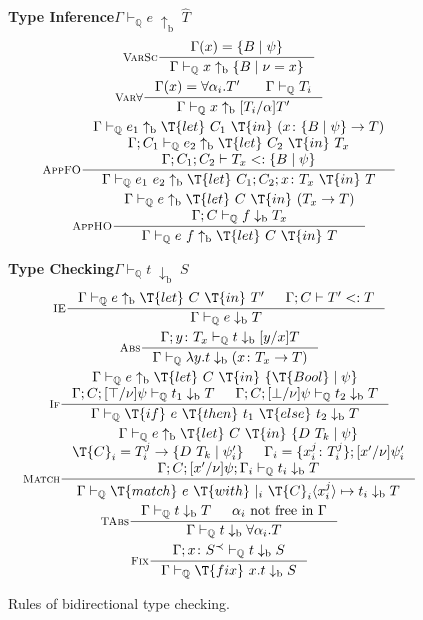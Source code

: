 \documentclass[10pt,preprint]{sigplanconf-pldi16}
\theoremstyle{definition}
\newcommand{\Subt}{<:}
\newcommand{\App}[2]{{#1}\ {#2}}
\newcommand{\env}{\Gamma}
\newcommand{\produceB}{\;{\mathrm{\uparrow_b}}\;}
\newcommand{\consumeB}{\;{\mathrm{\downarrow_b}}\;}
\newcommand{\funT}[3]{{#1}\colon {#2} \to {#3}}
\newcommand{\before}{\prec}
\newcommand{\contT}[2]{\T{let}\ {#1}\ \T{in}\ {#2}}
\newcommand{\quals}{\mathbb{Q}}
\newcommand{\entailsQ}{\vdash_{\quals}}
\begin{document}
\begin{figure}
\small
\textbf{Type Inference}\quad$\boxed{\env \entailsQ e \produceB \hat{T}}$
\begin{gather*}
\inference[\textsc{VarSc}]
{\env(x) =\{B \mid \psi\}}
{\env \entailsQ x \produceB \{B\mid\nu = x\} }
\\
\inference[\textsc{Var$\forall$}]
{\env(x)=\forall\alpha_i.T'\ &  \env \entailsQ T_i}
{\env \entailsQ x \produceB [T_i/\alpha]T'}
\\
\inference[\textsc{AppFO}]
{\env \entailsQ e_1 \produceB \contT{C_1}{(\funT{x}{\{B \mid \psi\}}{T})}    \\  
\env;C_1 \entailsQ e_2\produceB \contT{C_2}{T_x} \\
\env;C_1;C_2 \vdash T_x \Subt \{B \mid \psi\}}
{\env \entailsQ \App{e_1}{e_2} \produceB \contT{C_1;C_2;x\colon T_x}{T} }
\\
\inference[\textsc{AppHO}]
{\env \entailsQ e \produceB \contT{C}{(T_x \to T)}   \\  
\env;C \entailsQ f \consumeB T_x}
{\env \entailsQ \App{e}{f} \produceB \contT{C}{T}}
\end{gather*}

\textbf{Type Checking}\quad$\boxed{\env \entailsQ t \consumeB S}$
\begin{gather*}
\inference[\textsc{IE}]
{\env \entailsQ e \produceB \contT{C}{T'} & \env;C \vdash T' \Subt T}
{\env \entailsQ e \consumeB T}
\\
\inference[\textsc{Abs}]
{\env;y\colon T_x \entailsQ t \consumeB [y/x]T}
{\env \entailsQ \lambda y.t \consumeB (\funT{x}{T_x}{T})}
\\
\inference[\textsc{If}]
{\env \entailsQ e \produceB \contT{C}{\{\T{Bool}\mid \psi\}} \\
\env;C;[\top/\nu]\psi \entailsQ t_1 \consumeB T  &  
\env;C;[\bot/\nu]\psi \entailsQ t_2 \consumeB T}
{\env \entailsQ\T{if}\ e\ \T{then}\ t_1\ \T{else}\ t_2 \consumeB T}
\\
\inference[\textsc{Match}]
{\env \entailsQ e \produceB \contT{C}{\{D\ T_k\mid\psi\}}  \\
\T{C}_i = T_i^j \to \{D\ T_k\mid\psi'_i\}    &
\env_i = \{x_i^j\colon T_i^j\};[x'/\nu]\psi'_i \\
\env;C;[x'/\nu]\psi;\env_i \entailsQ t_i \consumeB T}
{\env \entailsQ \T{match}\ e\ \T{with}\ |_i\ \T{C}_i \langle x_i^j\rangle \mapsto t_i \consumeB T}
\\
\inference[\textsc{TAbs}]
{\env \entailsQ t \consumeB T  &  \alpha_i\ \text{not free in}\ \env}
{\env \entailsQ t \consumeB \forall\alpha_i.T}
\\
\inference[\textsc{Fix}]
{\env;x\colon S^\before \entailsQ t \consumeB S}
{\env \entailsQ \T{fix}\ x.t \consumeB S}
\end{gather*}
\caption{Rules of bidirectional type checking.}\label{fig:bidir}
\end{figure}
\end{document}
